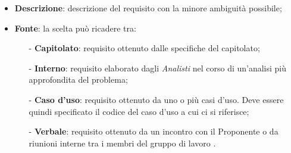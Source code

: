 \begin{itemize}
	\item\textbf{Descrizione}: descrizione del requisito con la minore ambiguità possibile;
	\item\textbf{Fonte}: la scelta può ricadere tra:
	\begin{itemize}
		\item[-] \textbf{Capitolato}: requisito ottenuto dalle specifiche del capitolato;
		\item[-] \textbf{Interno}: requisito elaborato dagli \textit{Analisti} nel corso di un'analisi più approfondita del problema;
		\item[-] \textbf{Caso d'uso}: requisito ottenuto da uno o più casi d'uso. Deve essere quindi specificato il codice del caso d'uso a cui ci si riferisce;
		\item[-] \textbf{Verbale}: requisito ottenuto da un incontro con il Proponente o da riunioni interne tra i membri del gruppo di lavoro \GRUPPO.
	\end{itemize}
\end{itemize}

\newpage

